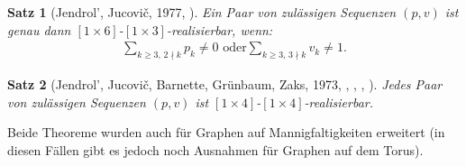 \documentclass[10pt, notheorems]{beamer}
\newtheorem{theorem}{Satz}[section]
\begin{document}
\begin{frame}
  \begin{theorem}[{\sc Jendrol', Jucovi{\v{c}}}, 1977, \cite{jendrol1977generalization}] \label{thm:eberhard:extended:3}
    Ein Paar von zulässigen Sequenzen $(p, v)$ ist genau dann $[1 \times 6]$-$[1 \times 3]$-realisierbar, wenn:
    \begin{align*}
      \sum_{k \geq 3,\,2 \nmid k} p_k \neq 0 \text{ oder} \sum_{k \geq 3,\,3 \nmid k} v_k \neq 1.
    \end{align*}
  \end{theorem}
  \pause
  \begin{theorem}[{\sc Jendrol', Jucovi{\v{c}}, Barnette, Grünbaum, Zaks}, 1973, \cite{jucovivc1973theorem}, \cite{barnette1971toroidal}, \cite{grunbaum1969planar}, \cite{zaks1971analogue}] \label{thm:eberhard:extended:4}
    Jedes Paar von zulässigen Sequenzen $(p, v)$ ist $[1 \times 4]$-$[1 \times 4]$-realisierbar.
  \end{theorem}
  \pause
  Beide Theoreme wurden auch für Graphen auf Mannigfaltigkeiten erweitert (in diesen Fällen gibt es jedoch noch Ausnahmen für Graphen auf dem Torus).
\end{frame}
\end{document}
